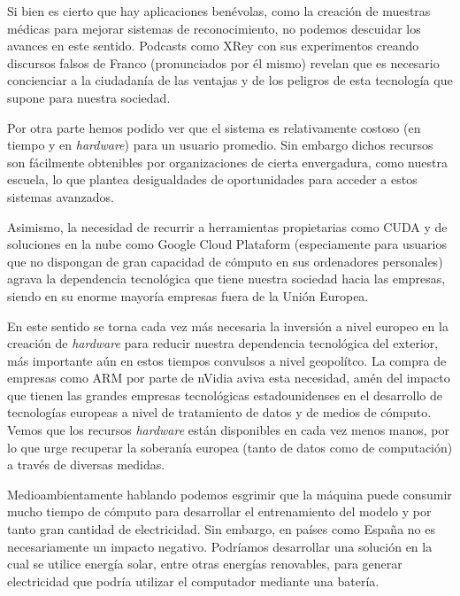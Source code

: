 \documentclass[../main.tex]{subfiles}
\begin{document}
Si bien es cierto que hay aplicaciones benévolas, como la creación de muestras médicas para mejorar sistemas de reconocimiento, no podemos descuidar los avances en este sentido. Podcasts como XRey con sus experimentos creando discursos falsos de Franco (pronunciados por él mismo) revelan que es necesario concienciar a la ciudadanía de las ventajas y de los peligros de esta tecnología que supone para nuestra sociedad. \newline

Por otra parte hemos podido ver que el sistema es relativamente costoso (en tiempo y en \textit{hardware}) para un usuario promedio. Sin embargo dichos recursos son fácilmente obtenibles por organizaciones de cierta envergadura, como nuestra escuela, lo que plantea desigualdades de oportunidades para acceder a estos sistemas avanzados. \newline

Asimismo, la necesidad de recurrir a herramientas propietarias como CUDA y de soluciones en la nube como Google Cloud Plataform (especiamente para usuarios que no dispongan de gran capacidad de cómputo en sus ordenadores personales) agrava la dependencia tecnológica que tiene nuestra sociedad hacia las empresas, siendo en su enorme mayoría empresas fuera de la Unión Europea. \newline

En este sentido se torna cada vez más necesaria la inversión a nivel europeo en la creación de \textit{hardware} para reducir nuestra dependencia tecnológica del exterior, más importante aún en estos tiempos convulsos a nivel geopolítco. La compra de empresas como ARM por parte de nVidia \cite{Roca2020} aviva esta necesidad, amén del impacto que tienen las grandes empresas tecnológicas estadounidenses en el desarrollo de tecnologías europeas a nivel de tratamiento de datos y de medios de cómputo. Vemos que los recursos \textit{hardware} están disponibles en cada vez menos manos, por lo que urge recuperar la soberanía europea (tanto de datos como de computación) a través de diversas medidas. \newline

Medioambientamente hablando podemos esgrimir que la máquina puede consumir mucho tiempo de cómputo para desarrollar el entrenamiento del modelo y por tanto gran cantidad de electricidad. Sin embargo, en países como España no es necesariamente un impacto negativo. Podríamos desarrollar una solución en la cual se utilice energía solar, entre otras energías renovables, para generar electricidad que podría utilizar el computador mediante una batería. \newline
\end{document}
